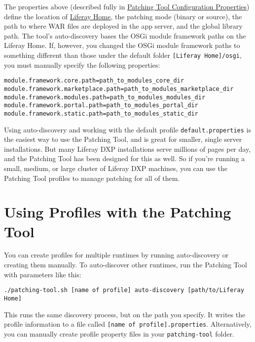 The properties above (described fully in
\href{/docs/7-2/deploy/-/knowledge_base/d/patching-tool-configuration-properties}{Patching
Tool Configuration Properties}) define the location of
\href{/docs/7-2/deploy/-/knowledge_base/d/liferay-home}{Liferay Home},
the patching mode (binary or source), the path to where WAR files are
deployed in the app server, and the global library path. The tool's
auto-discovery bases the OSGi module framework paths on the Liferay
Home. If, however, you changed the OSGi module framework paths to
something different than those under the default folder
\texttt{{[}Liferay\ Home{]}/osgi}, you must manually specify the
following properties:

\begin{verbatim}
module.framework.core.path=path_to_modules_core_dir
module.framework.marketplace.path=path_to_modules_marketplace_dir
module.framework.modules.path=path_to_modules_modules_dir
module.framework.portal.path=path_to_modules_portal_dir
module.framework.static.path=path_to_modules_static_dir
\end{verbatim}

Using auto-discovery and working with the default profile
\texttt{default.properties} is the easiest way to use the Patching Tool,
and is great for smaller, single server installations. But many Liferay
DXP installations serve millions of pages per day, and the Patching Tool
has been designed for this as well. So if you're running a small,
medium, or large cluster of Liferay DXP machines, you can use the
Patching Tool profiles to manage patching for all of them.

\section{Using Profiles with the Patching
Tool}\label{using-profiles-with-the-patching-tool}

You can create profiles for multiple runtimes by running auto-discovery
or creating them manually. To auto-discover other runtimes, run the
Patching Tool with parameters like this:

\begin{verbatim}
./patching-tool.sh [name of profile] auto-discovery [path/to/Liferay Home]
\end{verbatim}

This runs the same discovery process, but on the path you specify. It
writes the profile information to a file called
\texttt{{[}name\ of\ profile{]}.properties}. Alternatively, you can
manually create profile property files in your \texttt{patching-tool}
folder.

